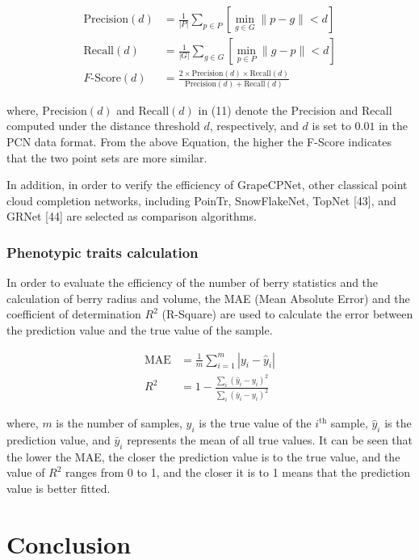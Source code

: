 \documentclass[12pt]{article}
\begin{document}
\begin{align}
    \text{Precision}(d) &= \frac{1}{|P|} \sum_{p \in P} \left[ \min_{g \in G} \|p - g\| < d \right] \tag{9}\\
    \text{Recall}(d) &= \frac{1}{|G|} \sum_{g \in G} \left[ \min_{p \in P} \|g - p\| < d \right] \tag{10}\\
    F\text{-Score}(d) &= \frac{2 \times \text{Precision}(d) \times \text{Recall}(d)}{\text{Precision}(d) + \text{Recall}(d)} \tag{11}
\end{align}

{\raggedright where, Precision$(d)$ and Recall$(d)$ in (11) denote the Precision and Recall computed under the distance threshold $d$, respectively, and $d$ is set to $0.01$ in the PCN data format. 
From the above Equation, the higher the F-Score indicates that the two point sets are more similar.}

In addition, in order to verify the efficiency of GrapeCPNet, other classical point cloud completion networks, including PoinTr, SnowFlakeNet, TopNet [43], and GRNet [44] are selected as comparison algorithms. 

\subsubsection{Phenotypic traits calculation}

In order to evaluate the efficiency of the number of berry statistics and the calculation of berry radius and volume, the MAE (Mean Absolute Error) and the coefficient of determination $R^2$ (R-Square) are used to calculate the error between the prediction value and the true value of the sample.

\begin{align}
    \text{MAE} &= \frac{1}{m} \sum_{i=1}^{m} |y_i - \hat{y}_i| \tag{12}\\
    R^2 &= 1 - \frac{\sum_{i} (\hat{y}_i - y_i)^2}{\sum_{i} (\bar{y}_i - y_i)^2} \tag{13}
\end{align}

{\raggedright where, $m$ is the number of samples, $y_i$ is the true value of the $i^{\text{th}}$ sample, $\hat{y}_i$ is the prediction value, and $\bar{y}_i$ represents the mean of all true values. 
It can be seen that the lower the MAE, the closer the prediction value is to the true value, and the value of $R^2$ ranges from 0 to 1, and the closer it is to 1 means that the prediction value is better fitted.}


\section{Conclusion}
\end{document}
